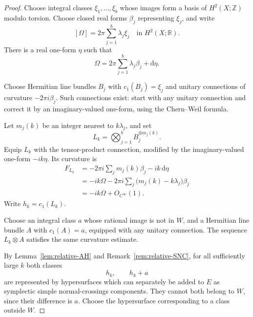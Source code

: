 \documentclass[11pt]{article}
\theoremstyle{definition}
\theoremstyle{remark}
\newcommand{\R}{\mathbb R}
\newcommand{\Z}{\mathbb Z}
\newcommand{\dd}{\mathrm d}
\begin{document}
\begin{proof}
Choose integral classes $\xi_1,\ldots,\xi_b$ whose images form a
basis of $H^2(X;\Z)$ modulo torsion.  Choose closed real forms
$\beta_j$ representing $\xi_j$, and write
\[
[\Omega]=2\pi\sum_{j=1}^{b}\lambda_j\xi_j
\quad\text{in }H^2(X;\R).
\]
There is a real one-form $\eta$ such that
\[
\Omega=2\pi\sum_{j=1}^{b}\lambda_j\beta_j+\dd\eta.
\]

Choose Hermitian line bundles $B_j$ with $c_1(B_j)=\xi_j$ and
unitary connections of curvature $-2\pi i\beta_j$.
Such connections exist: start with any unitary connection and
correct it by an imaginary-valued one-form, using the
Chern--Weil formula.

Let $m_j(k)$ be an integer nearest to $k\lambda_j$, and set
\[
L_k=\bigotimes_{j=1}^{b}B_j^{\otimes m_j(k)}.
\]
Equip $L_k$ with the tensor-product connection, modified by
the imaginary-valued one-form $-ik\eta$.  Its curvature is
\begin{align*}
F_{L_k}
&=-2\pi i\sum_j m_j(k)\beta_j-ik\,\dd\eta\\
&=-ik\Omega
  -2\pi i\sum_j\bigl(m_j(k)-k\lambda_j\bigr)\beta_j\\
&=-ik\Omega+O_{C^\infty}(1).
\end{align*}
Write $h_k=c_1(L_k)$.

Choose an integral class $a$ whose rational image is not in $W$,
and a Hermitian line bundle $A$ with $c_1(A)=a$, equipped with
any unitary connection.  The sequence $L_k\otimes A$ satisfies
the same curvature estimate.

By Lemma~\ref{lem:relative-AH} and
Remark~\ref{rem:relative-SNC}, for all sufficiently large $k$
both classes
\[
h_k,\qquad h_k+a
\]
are represented by hypersurfaces which can separately be added
to $E$ as symplectic simple normal-crossings components.
They cannot both belong to $W$, since their difference is $a$.
Choose the hypersurface corresponding to a class outside $W$.
\end{proof}
\end{document}
